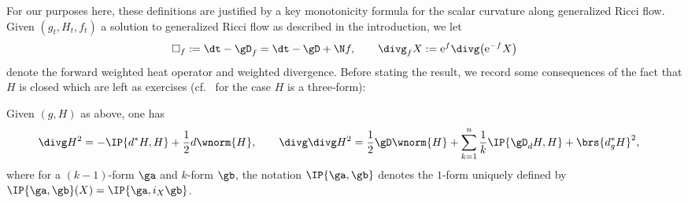 For our purposes here, these definitions are justified by a key monotonicity formula for the scalar curvature along generalized Ricci flow. Given $(g_t, H_t, f_t)$ a solution to generalized Ricci flow as described in the introduction, we let
\begin{align*}
\square_f := \dt - \gD_f = \dt - \gD + \N f, \qquad \divg_f X := {\rm e}^{f} \divg \big({\rm e}^{-f} X\big)
\end{align*}
denote the forward weighted heat operator and weighted divergence. Before stating the result, we record some consequences of the fact that $H$ is closed which are left as exercises (cf.\ \cite[Lemma~3.19]{GRFbook} for the case $H$ is a three-form):
\begin{Lemma} \label{l:HBianchi} Given $(g, H)$ as above, one has
\begin{align*}
& \divg H^2 = - \IP{d^* H, H} + \frac{1}{2} d \wnorm{H},\qquad
 \divg \divg H^2 = \frac{1}{2} \gD \wnorm{H} + \sum_{k=1}^n \frac{1}{k} \IP{\gD_d H, H} + \brs{d^*_g H}^2,
\end{align*}
where for a $(k-1)$-form $\ga$ and $k$-form $\gb$, the notation $\IP{\ga, \gb}$ denotes the $1$-form uniquely defined by $\IP{\ga,\gb}(X) = \IP{\ga, i_X \gb}$.
\end{Lemma}

